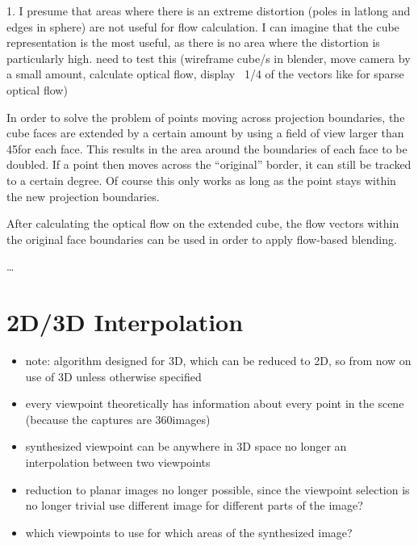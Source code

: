1. I presume that areas where there is an extreme distortion (poles in latlong and edges in sphere) are not useful for flow calculation. I can imagine that the cube representation is the most useful, as there is no area where the distortion is particularly high. \ar need to test this (wireframe cube/s in blender, move camera by a small amount, calculate optical flow, display ~1/4 of the vectors like for sparse optical flow) 

In order to solve the problem of points moving across projection boundaries, the cube faces are extended by a certain amount by using a field of view larger than 45\degree for each face. This results in the area around the boundaries of each face to be doubled. If a point then moves across the ``original'' border, it can still be tracked to a certain degree. Of course this only works as long as the point stays within the new projection boundaries.

After calculating the optical flow on the extended cube, the flow vectors within the original face boundaries can be used in order to apply flow-based blending.

\ldots

\section{2D/3D Interpolation}

\begin{itemize}
    \item note: algorithm designed for 3D, which can be reduced to 2D, so from now on use of 3D unless otherwise specified
    \item every viewpoint theoretically has information about every point in the scene (because the captures are 360\degree images)
    \item synthesized viewpoint can be anywhere in 3D space \ar no longer an interpolation between two viewpoints
    \item reduction to planar images no longer possible, since the viewpoint selection is no longer trivial \ar use different image for different parts of the image?
    \item which viewpoints to use for which areas of the synthesized image?
\end{itemize}

